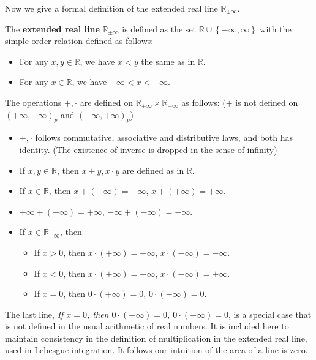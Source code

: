 \documentclass[../main.tex]{subfiles}
\begin{document}
Now we give a formal definition of the extended real line $\mathbb{R}_{\pm \infty}$.
\begin{plainblackenv}
	The \textbf{extended real line} $\mathbb{R}_{\pm \infty}$ is defined as the set $\mathbb{R}\cup \left\{ -\infty ,\infty  \right\}$ with the simple order relation defined as follows:
	\begin{itemize}
		\item For any $x,y\in \mathbb{R}$, we have $x < y$ the same as in $\mathbb{R}$.
		\item For any $x\in \mathbb{R}$, we have $-\infty < x < +\infty$.
	\end{itemize}
	The operations $+, \cdot $ are defined on $\mathbb{R}_{\pm \infty} \times \mathbb{R}_{\pm \infty }$ as follows: ($+$ is not defined on $(+\infty ,-\infty )_p$ and $(-\infty ,+\infty )_p$)
	\begin{itemize}
		\item $+, \cdot $ follows commutative, associative and distributive laws, and both has identity. (The existence of inverse is dropped in the sense of infinity)
		\item If $x,y\in \mathbb{R}$, then $x+y, x\cdot y$ are defined as in $\mathbb{R}$.
		\item If $x\in \mathbb{R}$, then $x+(-\infty ) = -\infty $, $x+ (+\infty ) = +\infty $.
		\item $+\infty + (+\infty ) = +\infty $, $-\infty + (-\infty ) = -\infty $.
		\item If $x\in \mathbb{R}_{\pm \infty }$, then
			\begin{itemize}
			\item If $x>0$, then $x\cdot (+\infty ) = +\infty $, $x\cdot (-\infty ) = -\infty $.
			\item If $x<0$, then $x\cdot (+\infty ) = -\infty $, $x\cdot (-\infty ) = +\infty $.
			\item If $x=0$, then $0\cdot (+\infty ) = 0$, $0\cdot (-\infty ) = 0$.
			\end{itemize}
	\end{itemize}
\end{plainblackenv}

\begin{remark}
	The last line, \textit{If $x=0$, then $0\cdot (+\infty ) = 0$, $0\cdot (-\infty ) = 0$}, is a special case that is not defined in the usual arithmetic of real numbers. It is included here to maintain consistency in the definition of multiplication in the extended real line, used in Lebesgue integration. It follows our intuition of the area of a line is zero.
\end{remark}
\end{document}
